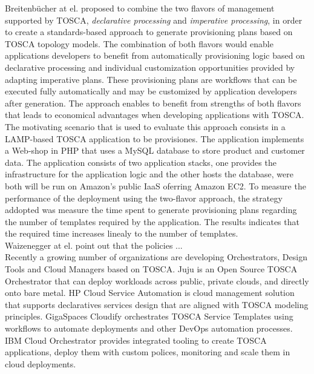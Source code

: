 Breitenb\"{u}cher at el. \cite{breitenbucher2014combining} proposed to combine the two flavors of management supported by TOSCA, \textit{declarative processing} and
\textit{imperative processing}, in order to create a standards-based approach to generate provisioning plans based on TOSCA topology models. The
combination of both flavors would enable applications developers to benefit from automatically provisioning logic based on declarative processing and
individual customization opportunities provided by adapting imperative plans. These provisioning plans are workflows that can be executed fully automatically and
may be customized by application developers after generation. The approach enables to benefit from strengths of both flavors that leads to economical advantages
when developing applications with TOSCA. The motivating scenario that is used to evaluate this approach consists in a LAMP-based TOSCA application to be provisiones.
The application implements a Web-shop in PHP that uses a MySQL database to store product and customer data. The application consists of two application stacks, one provides
the infrastructure for the application logic and the other hosts the database, were both will be run on Amazon's public IaaS oferring Amazon EC2. To measure the performance
of the deployment using the two-flavor approach, the strategy addopted was measure the time spent to generate provisioning plans regarding the number of templates required
by the application. The results indicates that the required time increases linealy to the number of templates.\\

Waizenegger at el. \cite{waizenegger2013policy4tosca} point out that the policies ...\\


Recently a growing number of organizations are developing Orchestrators, Design Tools and Cloud Managers based on TOSCA. Juju is an Open Source TOSCA Orchestrator that
can deploy workloads across public, private clouds, and directly onto bare metal. HP Cloud Service Automation is cloud management solution that supports declaratives
services design that are aligned with TOSCA modeling principles. GigaSpaces Cloudify orchestrates TOSCA Service Templates using workflows to automate deployments and other
DevOps automation processes. IBM Cloud Orchestrator provides integrated tooling to create TOSCA applications, deploy them with custom polices, monitoring and scale them in cloud deployments.
